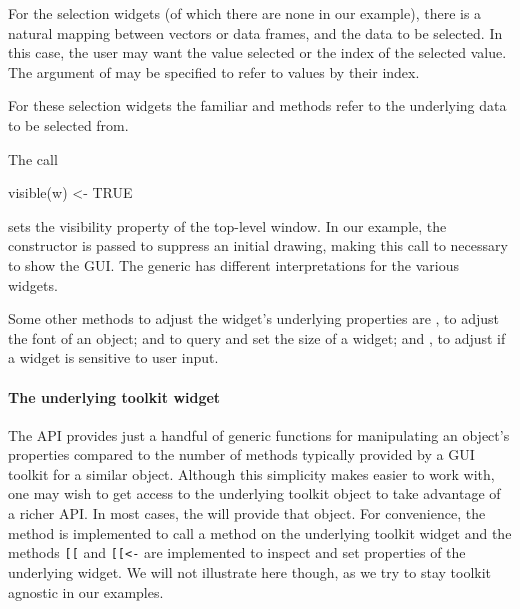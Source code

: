 For the selection widgets (of which there are none in our example), there
is a natural mapping between vectors or data frames, and the data to
be selected. In this case, the user may want the value selected or the
index of the selected value. The  argument of
 may be specified to refer to values by their index. 

For these selection widgets the familiar \meth{[} and \meth{[\ASSIGN}
methods refer to the underlying data to be selected from.



The call
\begin{Schunk}
\begin{Sinput}
 visible(w) <- TRUE
\end{Sinput}
\end{Schunk}
%
sets the visibility property of the top-level window. In our example,
the  constructor is passed  to
suppress an initial drawing, making this call to
 necessary to show the GUI. The
 generic has different interpretations for the
various widgets.

Some other methods to adjust the widget's underlying properties are
, to adjust the font of an object;  and
 to query and set the size of a widget; and
, to adjust if a widget is sensitive to user
input.


\paragraph{The underlying toolkit widget}
The  API provides just a handful of generic functions
for manipulating an object's properties compared to the number of
methods typically provided by a GUI toolkit for a similar
object. Although this simplicity makes  easier to work
with, one may wish to get access to the underlying toolkit object to
take advantage of a richer API. In most cases, the
 will provide that object.  For convenience,
the method  is implemented to call a method on
the underlying toolkit widget and the methods \verb+[[+
and \verb+[[<-+ are implemented to inspect and set
properties of the underlying widget.  We will not illustrate here though,
as we try to stay toolkit agnostic in our examples.


